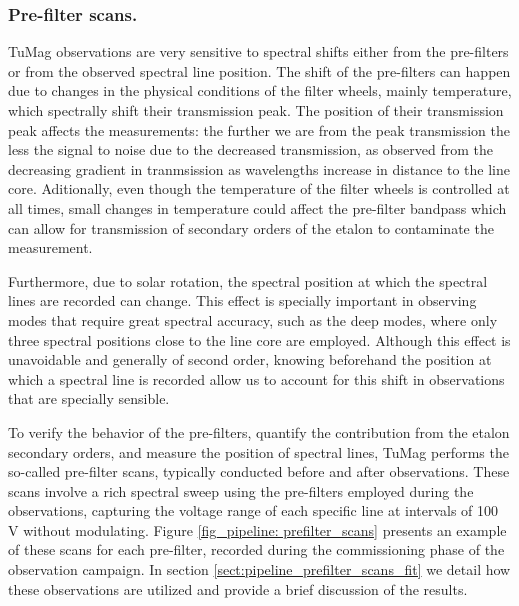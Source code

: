 \subsubsection{\label{ref:spectral_scans}Pre-filter scans.}

TuMag observations are very sensitive to spectral shifts either from the pre-filters or from the observed spectral line position. The shift of the pre-filters can happen due to changes in the physical conditions of the filter wheels, mainly temperature, which spectrally shift their transmission peak. The position of their transmission peak affects the measurements: the further we are from the peak transmission the less the signal to noise due to the decreased transmission, as observed from the decreasing gradient in tranmsission as wavelengths increase in distance to the line core. Aditionally, even though the temperature of the filter wheels is controlled at all times, small changes in temperature could affect the pre-filter bandpass which can allow for transmission of secondary orders of the etalon to contaminate the measurement.

Furthermore, due to solar rotation, the spectral position at which the spectral lines are recorded can change. This effect is specially important in observing modes that require great spectral accuracy, such as the deep modes, where only three spectral positions close to the line core are employed. Although this effect is unavoidable and generally of second order, knowing beforehand the position at which a spectral line is recorded allow us to account for this shift in observations that are specially sensible.  

To verify the behavior of the pre-filters, quantify the contribution from the etalon secondary orders, and measure the position of spectral lines, TuMag performs the so-called pre-filter scans, typically conducted before and after observations. These scans involve a rich spectral sweep using the pre-filters employed during the observations, capturing the voltage range of each specific line at intervals of 100 V without modulating. Figure \ref{fig_pipeline: prefilter_scans} presents an example of these scans for each pre-filter, recorded during the commissioning phase of the observation campaign. In section \ref{sect:pipeline_prefilter_scans_fit} we detail how these observations are utilized and provide a brief discussion of the results.


